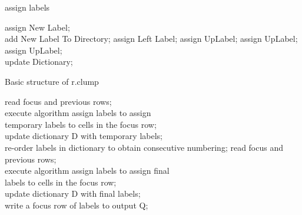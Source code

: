 \documentclass{article}
\begin{document}
\begin{algorithm}
    \caption{assign labels}
    \LinesNumbered

    {
        {
            {
                assign New Label; \\ 
                add New Label To Directory;
            }
            \Else
            {
                {
                    assign Left Label;
                }
                \Else
                {
                    {
                        assign UpLabel;
                    }
                    \Else
                    {
                        {
                            assign UpLabel;
                        }
                        \Else
                        {
                            assign UpLabel; \\
                            {
                                update Dictionary;
                            }
                        }
                    }
                }
            }
        }
    }
\end{algorithm}



\begin{algorithm}
  \caption{Basic structure of r.clump}
  {
    read focus and previous rows;\\
    execute algorithm assign labels to assign\\
    temporary labels to cells in the focus row;\\
    update dictionary D with temporary labels;\\
  }
  re-order labels in dictionary to obtain consecutive numbering;
  {
    read focus and previous rows;\\
    execute algorithm assign labels to assign final\\
    labels to cells in the focus row;\\
    update dictionary D with final labels;\\
    write a focus row of labels to output Q;\\
  }

\end{algorithm}
\end{document}
